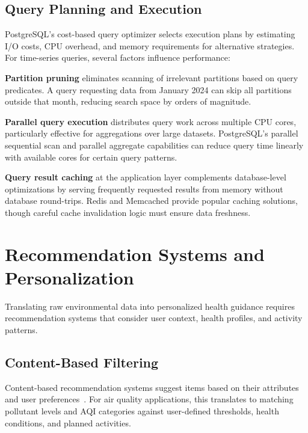 \subsection{Query Planning and Execution}
\label{subsec:lit_query_plan}

PostgreSQL's cost-based query optimizer selects execution plans by estimating I/O costs, CPU overhead, and memory requirements for alternative strategies. For time-series queries, several factors influence performance:

\textbf{Partition pruning} eliminates scanning of irrelevant partitions based on query predicates. A query requesting data from January 2024 can skip all partitions outside that month, reducing search space by orders of magnitude.

\textbf{Parallel query execution} distributes query work across multiple CPU cores, particularly effective for aggregations over large datasets. PostgreSQL's parallel sequential scan and parallel aggregate capabilities can reduce query time linearly with available cores for certain query patterns.

\textbf{Query result caching} at the application layer complements database-level optimizations by serving frequently requested results from memory without database round-trips. Redis and Memcached provide popular caching solutions, though careful cache invalidation logic must ensure data freshness.

\section{Recommendation Systems and Personalization}
\label{sec:lit_reco}

Translating raw environmental data into personalized health guidance requires recommendation systems that consider user context, health profiles, and activity patterns.

\subsection{Content-Based Filtering}
\label{subsec:lit_content}

Content-based recommendation systems suggest items based on their attributes and user preferences~\citep{epaaqi}. For air quality applications, this translates to matching pollutant levels and AQI categories against user-defined thresholds, health conditions, and planned activities.

